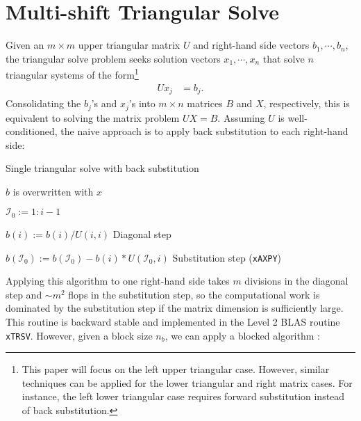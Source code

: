 \documentclass{article}
\begin{document}
\section{Multi-shift Triangular Solve} Given an \(m\times m\) upper
triangular matrix \(U\) and right-hand side vectors
\(b_1,\cdots,b_n\), the triangular solve problem seeks solution
vectors \(x_1,\cdots,x_n\) that solve \(n\) triangular systems of the
form\footnote{This paper will focus on the left upper triangular
  case. However, similar techniques can be applied for the lower
  triangular and right matrix cases. For instance, the left lower
  triangular case requires forward substitution instead of back
  substitution.}
\begin{align}
  U x_j &= b_j.
\end{align}
Consolidating the \(b_j\)'s and \(x_j\)'s into \(m\times n\) matrices
\(B\) and \(X\), respectively, this is equivalent to solving the
matrix problem \(UX=B\).  Assuming \(U\) is well-conditioned, the
naive approach is to apply back substitution to each right-hand side:
\begin{algorithm}[H]
  \caption{Single triangular solve with back substitution}
  \label{algorithm:trsv}
  \begin{algorithmic}
    
    \Comment \(b\) is overwritten with \(x\)
    

    \State \(\mathcal{I}_0 := 1:i-1\)

    \State \(b(i) := b(i) / U(i,i)\) \Comment Diagonal step

    \State \(b(\mathcal{I}_0) := b(\mathcal{I}_0) - b(i) * U(\mathcal{I}_0,i)\) \Comment Substitution step (\texttt{xAXPY})

    \EndFor

    \EndProcedure

  \end{algorithmic}
\end{algorithm}
\noindent
Applying this algorithm to one right-hand side takes \(m\) divisions
in the diagonal step and \(\sim m^2 \) flops in the substitution step,
so the computational work is dominated by the substitution step if the
matrix dimension is sufficiently large. This routine is backward
stable and implemented in the Level 2 BLAS routine
\texttt{xTRSV}. However, given a block size \(n_b\), we can apply a
blocked algorithm \cite{golub2012matrix}:
\end{document}
